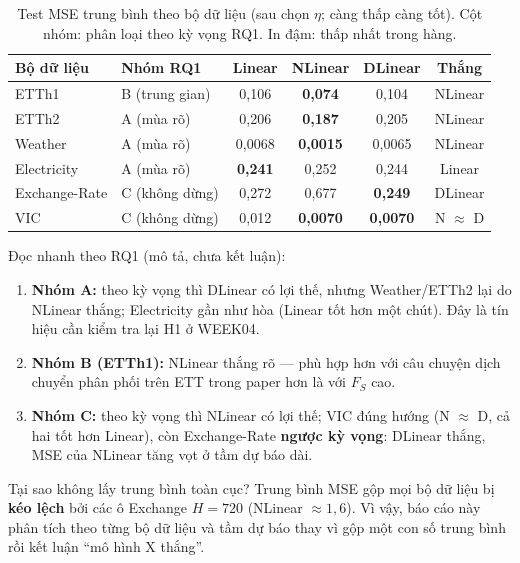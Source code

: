 \begin{table}[H]
  \centering
  \caption{Test MSE trung bình theo bộ dữ liệu (sau chọn \(\eta\); càng thấp càng tốt).
    Cột nhóm: phân loại theo kỳ vọng RQ1. In đậm: thấp nhất trong hàng.}
  \label{tab:meanmse}
  \small
  \begin{tabular}{@{}llcccc@{}}
    \toprule
    Bộ dữ liệu    & Nhóm RQ1       & Linear           & NLinear           & DLinear           & Thắng           \\
    \midrule
    ETTh1         & B (trung gian) & 0{,}106          & \textbf{0{,}074}  & 0{,}104           & NLinear         \\
    ETTh2         & A (mùa rõ)     & 0{,}206          & \textbf{0{,}187}  & 0{,}205           & NLinear         \\
    Weather       & A (mùa rõ)     & 0{,}0068         & \textbf{0{,}0015} & 0{,}0065          & NLinear         \\
    Electricity   & A (mùa rõ)     & \textbf{0{,}241} & 0{,}252           & 0{,}244           & Linear          \\
    Exchange-Rate & C (không dừng) & 0{,}272          & 0{,}677           & \textbf{0{,}249}  & DLinear         \\
    VIC           & C (không dừng) & 0{,}012          & \textbf{0{,}0070} & \textbf{0{,}0070} & N \(\approx\) D \\
    \bottomrule
  \end{tabular}
\end{table}

Đọc nhanh theo RQ1 (mô tả, chưa kết luận):

\begin{enumerate}
  \item \textbf{Nhóm A:} theo kỳ vọng thì DLinear có lợi thế, nhưng Weather/ETTh2 lại do NLinear thắng;
        Electricity gần như hòa (Linear tốt hơn một chút). Đây là tín hiệu cần kiểm tra lại H1 ở WEEK04.
  \item \textbf{Nhóm B (ETTh1):} NLinear thắng rõ --- phù hợp hơn với câu chuyện dịch chuyển phân phối
        trên ETT trong paper \cite{zeng2023ltsf} hơn là với \(F_S\) cao.
  \item \textbf{Nhóm C:} theo kỳ vọng thì NLinear có lợi thế; VIC đúng hướng (N \(\approx\) D, cả hai
        tốt hơn Linear), còn Exchange-Rate \textbf{ngược kỳ vọng}: DLinear thắng, MSE của NLinear
        tăng vọt ở tầm dự báo dài.
\end{enumerate}

\begin{infobox}{Tại sao không lấy trung bình toàn cục?}
  Trung bình MSE gộp mọi bộ dữ liệu bị \textbf{kéo lệch} bởi các ô Exchange \(H{=}720\)
  (NLinear \(\approx 1{,}6\)). Vì vậy, báo cáo này phân tích theo từng bộ dữ liệu và tầm dự báo
  thay vì gộp một con số trung bình rồi kết luận ``mô hình X thắng''.
\end{infobox}

